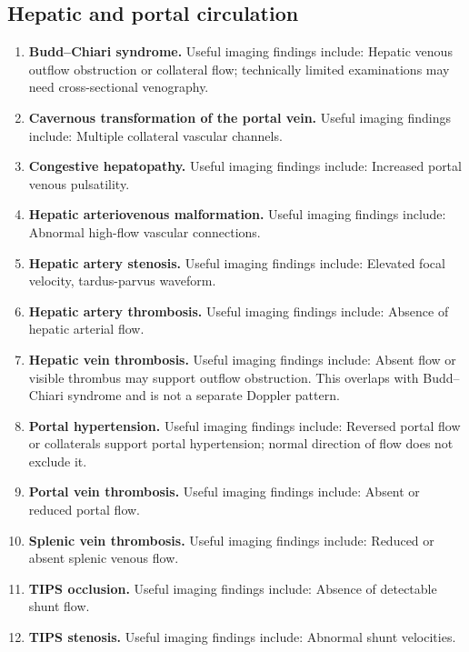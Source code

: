 \subsection{Hepatic and portal circulation}
\begin{enumerate}[leftmargin=*,itemsep=0.45em,topsep=0.4em]
\item \textbf{Budd--Chiari syndrome.} Useful imaging findings include: Hepatic venous outflow obstruction or collateral flow; technically limited examinations may need cross-sectional venography.
\item \textbf{Cavernous transformation of the portal vein.} Useful imaging findings include: Multiple collateral vascular channels.
\item \textbf{Congestive hepatopathy.} Useful imaging findings include: Increased portal venous pulsatility.
\item \textbf{Hepatic arteriovenous malformation.} Useful imaging findings include: Abnormal high-flow vascular connections.
\item \textbf{Hepatic artery stenosis.} Useful imaging findings include: Elevated focal velocity, tardus-parvus waveform.
\item \textbf{Hepatic artery thrombosis.} Useful imaging findings include: Absence of hepatic arterial flow.
\item \textbf{Hepatic vein thrombosis.} Useful imaging findings include: Absent flow or visible thrombus may support outflow obstruction. This overlaps with Budd--Chiari syndrome and is not a separate Doppler pattern.
\item \textbf{Portal hypertension.} Useful imaging findings include: Reversed portal flow or collaterals support portal hypertension; normal direction of flow does not exclude it.
\item \textbf{Portal vein thrombosis.} Useful imaging findings include: Absent or reduced portal flow.
\item \textbf{Splenic vein thrombosis.} Useful imaging findings include: Reduced or absent splenic venous flow.
\item \textbf{TIPS occlusion.} Useful imaging findings include: Absence of detectable shunt flow.
\item \textbf{TIPS stenosis.} Useful imaging findings include: Abnormal shunt velocities.
\end{enumerate}

